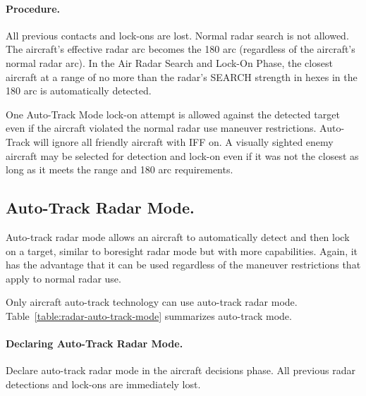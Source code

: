 \begin{advancedrules}
{\paragraph{Procedure.}  All previous contacts and lock-ons are lost. Normal radar search is not allowed. The aircraft's effective radar arc becomes the 180{\deg} arc (regardless of the aircraft's normal radar arc). In the Air Radar Search and Lock-On Phase, the closest aircraft at a range of no more than the radar's SEARCH strength in hexes in the 180{\deg} arc is automatically detected.

One Auto-Track Mode lock-on attempt is allowed against the detected target even if the aircraft violated the normal radar use maneuver restrictions. Auto-Track will ignore all friendly aircraft with IFF on. A visually sighted enemy aircraft may be selected for detection and lock-on  even if it was not the closest as long as it meets the range and 180{\deg} arc requirements. 

}{

\subsection{Auto-Track Radar Mode.}
\label{rule:auto-track-mode} 

Auto-track radar mode allows an aircraft to automatically detect and then lock on a target, similar to boresight radar mode but with more capabilities. Again, it has the advantage that it can be used regardless of the maneuver restrictions that apply to normal radar use.

Only aircraft auto-track technology can use auto-track radar mode. Table~\ref{table:radar-auto-track-mode} summarizes auto-track mode.

\paragraph{Declaring Auto-Track Radar Mode.} Declare auto-track radar mode in the aircraft decisions phase. All previous radar detections and lock-ons are immediately lost. 

}
\end{advancedrules}
